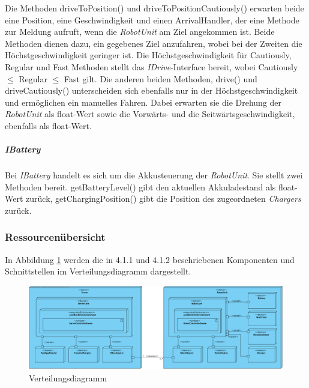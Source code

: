     		Die Methoden driveToPosition() und driveToPositionCautiously() erwarten beide eine Position, eine Geschwindigkeit und einen ArrivalHandler, der eine Methode zur Meldung aufruft, wenn die \emph{RobotUnit} am Ziel angekommen ist.
    		Beide Methoden dienen dazu, ein gegebenes Ziel anzufahren, wobei bei der Zweiten die Höchstgeschwindigkeit geringer ist.
    		Die Höchstgeschwindigkeit für Cautiously, Regular und Fast Methoden stellt das \emph{IDrive}-Interface bereit, wobei Cautiously $\leq$ Regular $\leq$ Fast gilt.
    		Die anderen beiden Methoden, drive() und driveCautiously() unterscheiden sich ebenfalls nur in der Höchstgeschwindigkeit und ermöglichen ein manuelles Fahren.
    		Dabei erwarten sie die Drehung der \emph{RobotUnit} als float-Wert sowie die Vorwärts- und die Seitwärtsgeschwindigkeit, ebenfalls als float-Wert.
    	\subparagraph{IBattery}\label{ibattery}
    		Bei \emph{IBattery} handelt es sich um die Akkusteuerung der \emph{RobotUnit}.
    		Sie stellt zwei Methoden bereit.
    		getBatteryLevel() gibt den aktuellen Akkuladestand als float-Wert zurück, getChargingPosition() gibt die Position des zugeordneten \emph{Chargers} zurück.


\pagebreak
\subsubsection{Ressourcenübersicht}
    In Abbildung \ref{fig:4-1-3-verteilungsdiagramm} werden die in 4.1.1 und 4.1.2 beschriebenen
    Komponenten und Schnittstellen im Verteilungsdiagramm dargestellt.

    \begin{figure}[H]
      \centering
      \includegraphics[width=1.25\textwidth, angle=90]{img/2-Analyse-4-Produktumgebung}
      \caption{Verteilungsdiagramm}
      \label{fig:4-1-3-verteilungsdiagramm}
    \end{figure}
